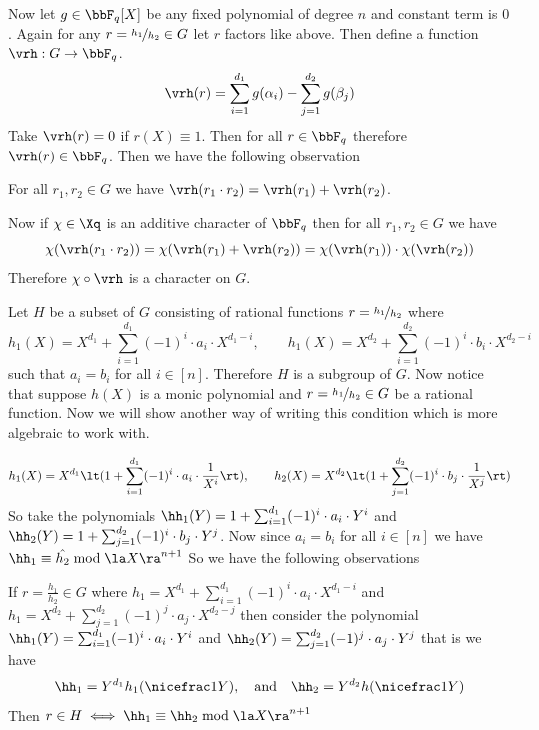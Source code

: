 Now let $g\in\bbF_q[X]$ be any fixed polynomial of degree $n$ and constant term is $0$. Again for any $r=\nicefrac{h_1}{h_2}\in G$ let $r$ factors like above. Then define a function $\vrh:G\to \bbF_q$. $$\vrh(r)=\sum_{i=1}^{d_1}g(\alpha_i)-\sum_{j=1}^{d_2}g(\beta_j)$$Take $\vrh(r)=0$ if $r(X)\equiv 1$. Then for all $r\in\bbF_q$ therefore $\vrh(r)\in\bbF_q$. Then we have the following observation
\begin{observation}
  For all $r_1,r_2\in G$ we have $\vrh(r_1\cdot r_2)=\vrh(r_1)+\vrh(r_2)$. 
\end{observation}
Now if $\chi\in\Xq$ is an additive character of $\bbF_q$ then for all $r_1,r_2\in G$ we have $$\chi(\vrh(r_1\cdot r_2))=\chi(\vrh(r_1)+\vrh(r_2))=\chi(\vrh(r_1))\cdot \chi(\vrh(r_2))$$Therefore $\chi\circ\vrh$ is a character on $G$. 

Let $H$ be a subset of $G$ consisting of rational functions $r=\nicefrac{h_1}{h_2}$ where $$h_1(X)=X^{d_1}+\sum_{i=1}^{d_1}(-1)^i\cdot a_i\cdot X^{d_1-i},\qquad h_1(X)=X^{d_2}+\sum_{i=1}^{d_2}(-1)^i\cdot b_i\cdot X^{d_2-i}$$ such that $a_i=b_i$ for all $i\in[n]$. Therefore $H$ is a subgroup of $G$. Now notice that suppose $h(X)$ is a monic polynomial and $r=\nicefrac{h_1}{h_2}\in G$ be a rational function. Now we will show another way of writing this condition which is more algebraic to work with.

$$h_1(X) = X^{d_1}\lt(1+\sum_{i=1}^{d_1}(-1)^i\cdot a_i\cdot \frac1{X^i}\rt),\qquad h_2(X) = X^{d_2}\lt(1+\sum_{j=1}^{d_2}(-1)^i\cdot b_j\cdot \frac1{X^j}\rt)$$So take the polynomials $\hh_1(Y)=1+\sum_{i=1}^{d_1}(-1)^i\cdot a_i\cdot Y^i$ and $\hh_2(Y)=1+\sum_{j=1}^{d_2}(-1)^i\cdot b_j\cdot Y^j$. Now since $a_i=b_i$ for all $i\in[n]$ we have $\hh_1\equiv \hat{h_2}\bmod{\la X\ra^{n+1}}$ So we have the following observations
\begin{observation}
  If $r=\frac{h_1}{h_2}\in G$ where $h_1=X^{d_1}+\sum_{i=1}^{d_1}(-1)^i\cdot a_i\cdot X^{d_1-i}$ and $h_1=X^{d_2}+\sum_{j=1}^{d_2}(-1)^j\cdot a_j\cdot X^{d_2-j}$ then consider the polynomial $\hh_1(Y)=\sum_{i=1}^{d_1}(-1)^i\cdot a_i\cdot Y^{i}$ and $\hh_2(Y)=\sum_{j=1}^{d_2}(-1)^j\cdot a_j\cdot Y^{j}$ that is we have  $$\hh_1=Y^{d_1}h_1(\nicefrac1Y),\quad\text{and}\quad\hh_2=Y^{d_2}h(\nicefrac1Y)$$Then $r\in H\iff \hh_1\equiv \hh_2\bmod{\la X\ra^{n+1}}$
\end{observation}



